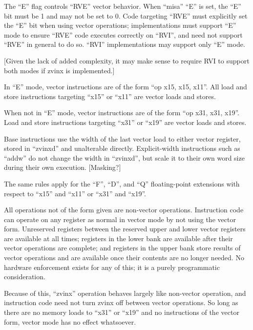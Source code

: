 The ``E'' flag controls ``RVE'' vector behavior.  When ``misa'' ``E'' is set,  the
``E'' bit must be 1 and may not be set to 0.  Code targeting ``RVE'' must explicitly
set the ``E'' bit when using vector operations; implementations must support ``E'' mode
to ensure ``RVE'' code executes correctly on ``RVI'', and need not support ``RVE'' in
general to do so.  ``RVI'' implementations may support only ``E'' mode.

[Given the lack of added complexity, it may make sense to require RVI to support both
modes if zvinx is implemented.]

In ``E'' mode, vector instructions are of the form ``op x15, x15, x11''.  All load and
store instructions targeting ``x15'' or ``x11'' are vector loads and stores.

When not in ``E'' mode, vector instructions are of the form ``op x31, x31, x19''.  Load
and store instructions targeting ``x31'' or ``x19'' are vector loads and stores.

Base instructions use the width of the last vector load to either vector register,
stored in ``zvinxd'' and unalterable directly.   Explicit-width instructions such as
``addw'' do not change the width in ``zvinxd'', but scale it to their own word size during
their own execution.  [Masking?]

The same rules apply for the ``F'', ``D'', and ``Q'' floating-point extensions with
respect to ``x15'' and ``x11'' or ``x31'' and ``x19''.

\begin{commentary}
    All operations not of the form given are non-vector operations.  Instruction code can
    operate on any register as normal in vector mode by not using the vector form.
    Unreserved registers between the reserved upper and lower vector registers are
    available at all times; registers in the lower bank are available after their vector
    operations are complete; and registers in the upper bank store results of vector
    operations and are available once their contents are no longer needed.  No hardware
    enforcement exists for any of this; it is a purely programmatic consideration.

    Because of this, ``zvinx'' operation behaves largely like non-vector operation, and
    instruction code need not turn zvinx off between vector operations.  So long as there
    are no memory loads to ``x31'' or ``x19'' and no instructions of the vector form,
    vector mode has no effect whatsoever.

\end{commentary}